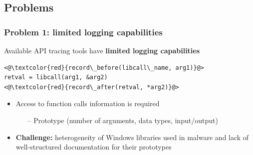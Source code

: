 \documentclass[compress]{beamer}
\begin{document}

\subsection{Problems}
\begin{frame}[fragile]
    \frametitle{Problem 1: limited logging capabilities}

Available API tracing tools have \textbf{limited logging capabilities}
\medskip
	\begin{block}{}
\begin{lstlisting}[basicstyle=\ttfamily\large,xleftmargin=50pt]
<@\textcolor{red}{record\_before(libcall\_name, arg1)}@> 
retval = libcall(arg1, &arg2)
<@\textcolor{red}{record\_after(retval, *arg2)}@> 
\end{lstlisting}
\end{block}	
\medskip
\begin{itemize}
\item Access to function calls information is required
\begin{itemize}
\item[--] Prototype (number of arguments, data types, input/output)
\end{itemize}
\medskip
\item \textbf{Challenge:} heterogeneity of Windows libraries used in malware and lack of well-structured documentation for their prototypes
\end{itemize}
	
\end{frame}
\end{document}
